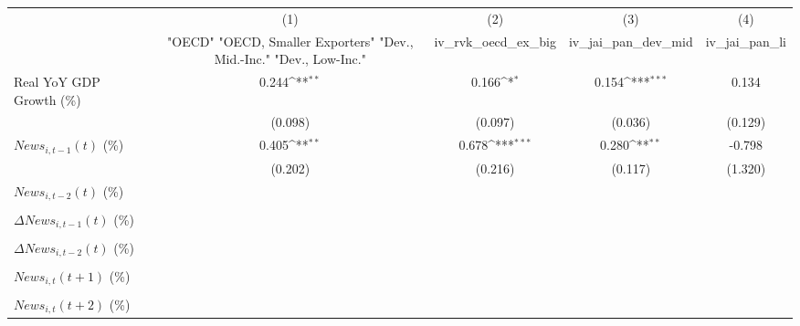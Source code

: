 {
\def\sym#1{\ifmmode^{#1}\else\(^{#1}\)\fi}
\begin{tabular}{l*{4}{c}}
\toprule
                    &\multicolumn{1}{c}{(1)}&\multicolumn{1}{c}{(2)}&\multicolumn{1}{c}{(3)}&\multicolumn{1}{c}{(4)}\\
                    &\multicolumn{1}{c}{ "OECD" "OECD, Smaller Exporters" "Dev., Mid.-Inc." "Dev., Low-Inc."}&\multicolumn{1}{c}{iv_rvk_oecd_ex_big}&\multicolumn{1}{c}{iv_jai_pan_dev_mid}&\multicolumn{1}{c}{iv_jai_pan_li}\\
\midrule
Real YoY GDP Growth (\%)&       0.244\sym{**} &       0.166\sym{*}  &       0.154\sym{***}&       0.134         \\
                    &     (0.098)         &     (0.097)         &     (0.036)         &     (0.129)         \\
\addlinespace
$ News_{i,t-1}(t)$ (\%)&       0.405\sym{**} &       0.678\sym{***}&       0.280\sym{**} &      -0.798         \\
                    &     (0.202)         &     (0.216)         &     (0.117)         &     (1.320)         \\
\addlinespace
$ News_{i,t-2}(t)$ (\%)&                     &                     &                     &                     \\
                    &                     &                     &                     &                     \\
\addlinespace
$ \Delta News_{i,t-1}(t)$ (\%)&                     &                     &                     &                     \\
                    &                     &                     &                     &                     \\
\addlinespace
$ \Delta News_{i,t-2}(t)$ (\%)&                     &                     &                     &                     \\
                    &                     &                     &                     &                     \\
\addlinespace
$ News_{i,t}(t+1)$ (\%)&                     &                     &                     &                     \\
                    &                     &                     &                     &                     \\
\addlinespace
$ News_{i,t}(t+2)$ (\%)&                     &                     &                     &                     \\

\end{tabular}}
